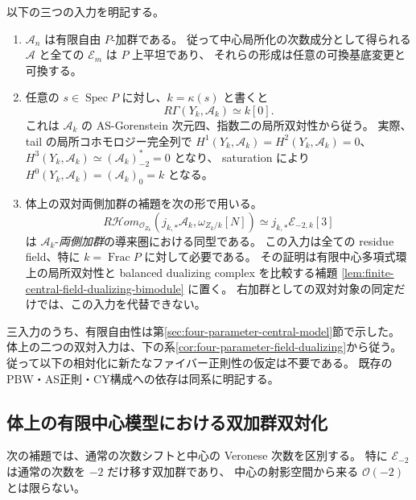 以下の三つの入力を明記する。
\begin{enumerate}
\item $\mathcal A_n$ は有限自由 $P$-加群である。
  従って中心局所化の次数成分として得られる
  $\mathscr A$ と全ての $\mathscr E_m$ は $P$ 上平坦であり、
  それらの形成は任意の可換基底変更と可換する。
\item 任意の $s\in\operatorname{Spec}P$ に対し、$k=\kappa(s)$ と書くと
  \begin{equation}\label{eq:relative-serre-field-cohom-input}
  R\Gamma(Y_k,\mathscr A_k)\simeq k[0].
  \end{equation}
  これは $\mathcal A_k$ の AS-Gorenstein 次元四、指数二の局所双対性から従う。
  実際、tail の局所コホモロジー完全列で
  $H^1(Y_k,\mathscr A_k)=H^2(Y_k,\mathscr A_k)=0$、
  $H^3(Y_k,\mathscr A_k)\simeq(\mathcal A_k)_{-2}^*=0$ となり、
  saturation により $H^0(Y_k,\mathscr A_k)=(\mathcal A_k)_0=k$ となる。
\item 体上の双対両側加群の補題を次の形で用いる。
  \begin{equation}\label{eq:relative-serre-field-bimodule-input}
  R\mathcal Hom_{\mathcal O_{Z_k}}
  (j_{k,*}\mathscr A_k,\omega_{Z_k/k}[N])
  \simeq j_{k,*}\mathscr E_{-2,k}[3]
  \end{equation}
  は $\mathscr A_k$-\emph{両側加群}の導来圏における同型である。
  この入力は全ての residue field、特に
  $k=\operatorname{Frac}P$ に対して必要である。
  その証明は有限中心多項式環上の局所双対性と
  balanced dualizing complex を比較する補題
  \ref{lem:finite-central-field-dualizing-bimodule} に置く。
  右加群としての双対対象の同定だけでは、この入力を代替できない。
\end{enumerate}

三入力のうち、有限自由性は第\ref{sec:four-parameter-central-model}節で示した。
体上の二つの双対入力は、下の系\ref{cor:four-parameter-field-dualizing}から従う。
従って以下の相対化に新たなファイバー正則性の仮定は不要である。
既存のPBW・AS正則・CY構成への依存は同系に明記する。

\subsection{体上の有限中心模型における双加群双対化}

次の補題では、通常の次数シフトと中心の Veronese 次数を区別する。
特に $\mathscr E_{-2}$ は通常の次数を $-2$ だけ移す双加群であり、
中心の射影空間から来る $\mathcal O(-2)$ とは限らない。

